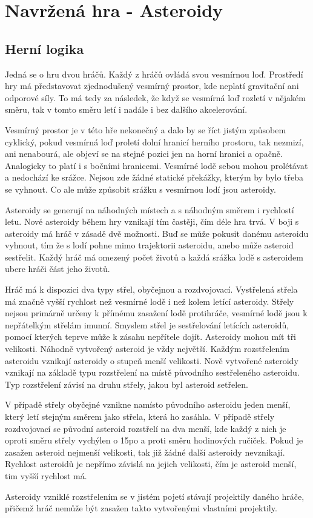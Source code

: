 \chapter{Navržená hra - Asteroidy}

\section{Herní logika}
Jedná se o hru dvou hráčů. 
Každý z hráčů ovládá svou vesmírnou loď.
Prostředí hry má představovat zjednodušený vesmírný prostor, kde neplatí gravitační ani odporové síly.
To má tedy za následek, že když se vesmírná loď rozletí v nějakém směru, tak v tomto směru letí i nadále i bez dalšího akcelerování.
\par
\label{HraniceProsotru}
Vesmírný prostor je v této hře nekonečný a dalo by se říct jistým způsobem cyklický, pokud vesmírná loď proletí dolní hranicí herního prostoru, tak nezmizí, ani nenabourá, ale objeví se na stejné pozici jen na horní hranici a opačně. Analogicky to platí i s bočními hranicemi.
Vesmírné lodě sebou mohou prolétávat a nedochází ke srážce.
Nejsou zde žádné statické překážky, kterým by bylo třeba se vyhnout. Co ale může způsobit srážku s vesmírnou lodí jsou asteroidy.    
\par
Asteroidy se generují na náhodných místech a s náhodným směrem i rychlostí letu. Nové asteroidy během hry vznikají tím častěji, čím déle hra trvá.
V boji s asteroidy má hráč v zásadě dvě možnosti. Buď se může pokusit danému asteroidu vyhnout, tím že s lodí pohne mimo trajektorii asteroidu, anebo může asteroid sestřelit.
Každý hráč má omezený počet životů a každá srážka lodě s asteroidem ubere hráči část jeho životů.
\par
Hráč má k dispozici dva typy střel, obyčejnou a rozdvojovací. Vystřelená střela má značně vyšší rychlost než vesmírné lodě i než kolem letící asteroidy.
Střely nejsou primárně určeny k přímému zasažení lodě protihráče, vesmírné lodě jsou k nepřátelkým střelám imunní.
Smyslem střel je sestřelování letících asteroidů, pomocí kterých teprve může k zásahu nepřítele dojít. Asteroidy mohou mít tři velikosti. Náhodně vytvořený asteroid je vždy největší. Každým rozstřelením asteroidu vznikají asteroidy o stupeň menší velikosti.
Nově vytvořené asteroidy vznikají na základě typu rozstřelení na místě původního sestřeleného asteroidu. Typ rozstřelení závisí na druhu střely, jakou byl asteroid setřelen. 
\par
V případě střely obyčejné vznikne namísto původního asteroidu jeden menší, který letí stejným směrem jako střela, která ho zasáhla.
V případě střely rozdvojovací se původní asteroid rozstřelí na dva menší, kde každý z nich je oproti směru střely vychýlen o 15\textdegree po a proti směru hodinových ručiček.
Pokud je zasažen asteroid nejmenší velikosti, tak již žádné další asteroidy nevznikají. 
Rychlost asteroidů je nepřímo závislá na jejich velikosti, čím je asteroid menší, tim vyšší rychlost má.
\par
Asteroidy vzniklé rozstřelením se v jistém pojetí stávají projektily daného hráče, přičemž hráč nemůže být zasažen takto vytvořenými vlastními projektily.

